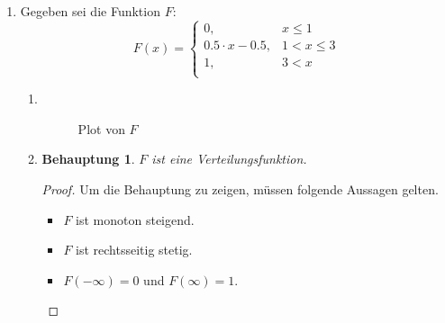 \documentclass[a4paper]{scrartcl}
\newtheorem*{behaupt}{Behauptung}
\begin{document}
\begin{enumerate}[label=\bfseries\arabic*.]
    \clearpage
    \item
        Gegeben sei die Funktion $F$:
        \begin{equation*}
            F(x) =
            \begin{cases}
                0, & x \leq 1 \\
                \num{0,5} \cdot x - \num{0,5}, & 1 < x \leq 3 \\
                1, & 3 < x \\
            \end{cases}
        \end{equation*}
        \begin{enumerate}[label=(\alph*)]
            \item \hfill \\
                \begin{figure}[H]
                    \centering
                    \caption{Plot von $F$}
                \end{figure}

            \item
                \begin{behaupt}
                    $F$ ist eine Verteilungsfunktion.
                \end{behaupt}
                \begin{proof}
                    Um die Behauptung zu zeigen, müssen folgende Aussagen
                    gelten.
                    \begin{itemize}
                        \item $F$ ist monoton steigend.
                        \item $F$ ist rechtsseitig stetig.
                        \item $F(-\infty) = 0$ und $F(\infty) = 1$.
                    \end{itemize}


\end{proof}
\end{enumerate}
\end{enumerate}
\end{document}
